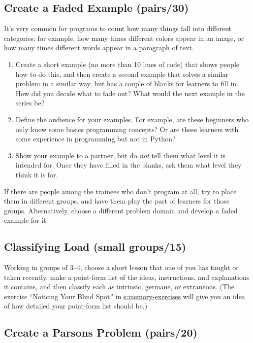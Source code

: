 \subsection{Create a Faded Example (pairs/30)}\label{create-a-faded-example-pairs30}

It's very common for programs to count how many things fall into
different categories: for example, how many times different colors
appear in an image, or how many times different words appear in a
paragraph of text.

\begin{enumerate}
\item
  Create a short example (no more than 10 lines of code) that shows
  people how to do this, and then create a second example that solves
  a similar problem in a similar way, but has a couple of blanks for
  learners to fill in. How did you decide what to fade out? What would
  the next example in the series be?
\item
  Define the audience for your examples. For example, are these
  beginners who only know some basics programming concepts? Or are
  these learners with some experience in programming but not in
  Python?
\item
  Show your example to a partner, but do \emph{not} tell them what level it
  is intended for. Once they have filled in the blanks, ask them what
  level they think it is for.
\end{enumerate}

If there are people among the trainees who don't program at all, try to
place them in different groups, and have them play the part of learners
for those groups. Alternatively, choose a different problem domain and
develop a faded example for it.

\subsection{Classifying Load (small groups/15)}\label{classifying-load-small-groups15}

Working in groups of 3--4, choose a short lesson that one of you has
taught or taken recently, make a point-form list of the ideas,
instructions, and explanations it contains, and then classify each as
intrinsic, germane, or extraneous. (The exercise ``Noticing Your Blind
Spot'' in \protect\hyperlink{SECTION}{s:memory-exercises} will give you an idea of how
detailed your point-form list should be.)

\subsection{Create a Parsons Problem (pairs/20)}\label{create-a-parsons-problem-pairs20}

